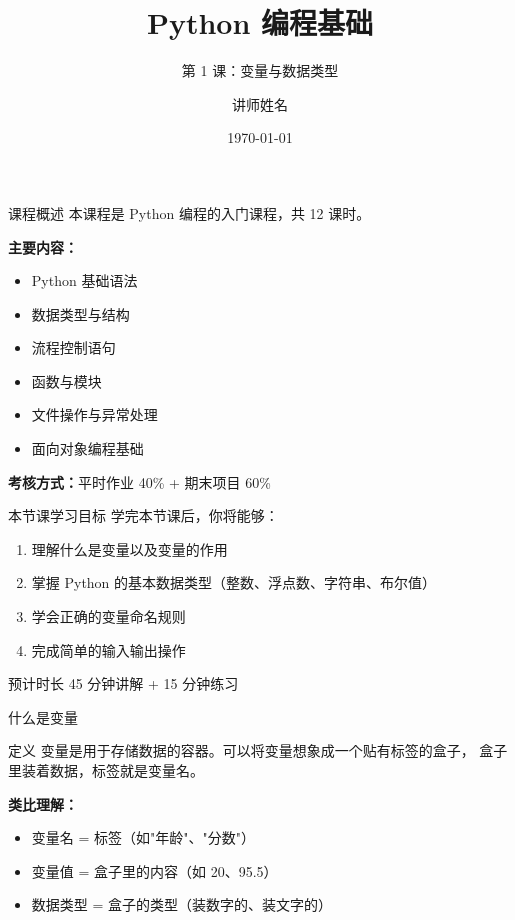 \documentclass[aspectratio=43,12pt]{beamer}
\title{\textbf{Python 编程基础}}
\subtitle{第 1 课：变量与数据类型}
\author{讲师姓名}
\institute{XX大学计算机学院}
\date{\today}
\begin{document}
\begin{frame}
    \titlepage
\end{frame}

\begin{frame}{课程概述}
    本课程是 Python 编程的入门课程，共 12 课时。
    
    \vspace{0.5em}
    \textbf{主要内容：}
    \begin{itemize}
        \item Python 基础语法
        \item 数据类型与结构
        \item 流程控制语句
        \item 函数与模块
        \item 文件操作与异常处理
        \item 面向对象编程基础
    \end{itemize}
    
    \vspace{0.5em}
    \textbf{考核方式：}平时作业 40\% + 期末项目 60\%
\end{frame}

\begin{frame}{本节课学习目标}
    学完本节课后，你将能够：
    \begin{enumerate}
        \item 理解什么是变量以及变量的作用
        \item 掌握 Python 的基本数据类型（整数、浮点数、字符串、布尔值）
        \item 学会正确的变量命名规则
        \item 完成简单的输入输出操作
    \end{enumerate}
    
    \vspace{1em}
    \begin{block}{预计时长}
        45 分钟讲解 + 15 分钟练习
    \end{block}
\end{frame}

\begin{frame}{什么是变量}
    \begin{block}{定义}
        变量是用于存储数据的容器。可以将变量想象成一个贴有标签的盒子，
        盒子里装着数据，标签就是变量名。
    \end{block}
    
    \vspace{1em}
    \textbf{类比理解：}
    \begin{itemize}
        \item 变量名 = 标签（如"年龄"、"分数"）
        \item 变量值 = 盒子里的内容（如 20、95.5）
        \item 数据类型 = 盒子的类型（装数字的、装文字的）
    \end{itemize}
\end{frame}
\end{document}

